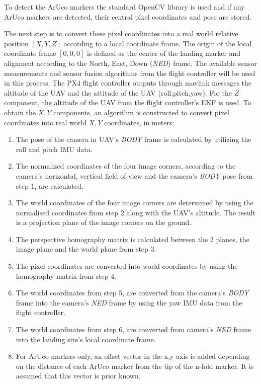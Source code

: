 \documentclass[conference]{IEEEtran}
\begin{document}
%
To detect the ArUco markers the standard OpenCV library is used and if
any ArUco markers are detected, their central pixel coordinates and
pose are stored.

The next step is to convert these pixel coordinates into a real world
relative position $[X,Y,Z]$ according to a local coordinate frame. The
origin of the local coordinate frame $[0,0,0]$ is defined as the
center of the landing marker and alignment according to the North,
East, Down (\emph{NED}) frame.
%
%
The available sensor measurements and sensor fusion algorithms from
the flight controller will be used in this process. The PX4 flight
controller outputs through mavlink messages the altitude of the UAV
and the attitude of the UAV (roll,pitch,yaw). For the $Z$ component,
the altitude of the UAV from the flight controller's EKF is used. To
obtain the $X,Y$ components, an algorithm is constructed to convert
pixel coordinates into real world $X,Y$ coordinates, in meters:
%
%
\begin{enumerate}

\item The pose of the camera in UAV's \emph{BODY} frame is calculated by utilizing the roll and pitch IMU data.

\item The normalized coordinates of the four image corners, according to the camera's horizontal, vertical field of view and the camera's \emph{BODY} pose from step 1, are calculated.

\item The world coordinates of the four image corners are determined by using the normalised coordinates from step 2 along with the UAV's altitude. The result is a projection plane of the image corners on the ground.

\item The perspective homography matrix is calculated between the 2 planes, the image plane and the world plane from step 3.

\item The pixel coordinates are converted into world coordinates by using the homography matrix from step 4.

\item The world coordinates from step 5, are converted from the camera's \emph{BODY} frame into the camera's \emph{NED} frame by using the yaw IMU data from the flight controller.

\item The world coordinates from step 6, are converted from camera's \emph{NED} frame into the landing site's local coordinate frame.

\item For ArUco markers only, an offset vector in the x,y axis is added depending on the distance of each ArUco marker from the tip of the n-fold marker. It is assumed that this vector is prior known.

\end{enumerate}
\end{document}
